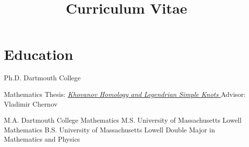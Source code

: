 \documentclass[letterpaper,sans]{moderncv}
\title{Curriculum Vitae}
\begin{document}
    \makecvtitle
    \section{Education}
            {Ph.D.}
            {Dartmouth College}
            {}
            {}
            {%
                Mathematics\newline
                Thesis:
                \href{https://digitalcommons.dartmouth.edu/dissertations/270/}{%
                    \textit{Khovanov Homology and Legendrian Simple Knots}%
                }\newline
                Advisor: Vladimir Chernov\strut%
            }
            {M.A.}
            {Dartmouth College}
            {}
            {}
            {Mathematics}
            {M.S.}
            {University of Massachusetts Lowell}
            {}
            {}
            {Mathematics}
            {B.S.}
            {University of Massachusetts Lowell}
            {}
            {}
            {Double Major in Mathematics and Physics}
\end{document}
